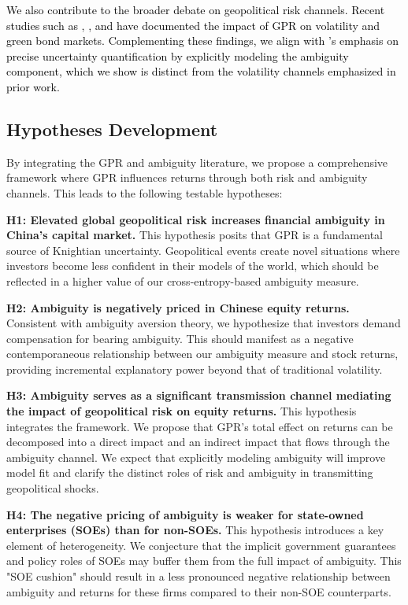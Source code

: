 \documentclass[preprint,12pt,authoryear]{elsarticle}
\begin{document}
\textcolor{black}{We also contribute to the broader debate on geopolitical risk channels. Recent studies such as \citet{Bouri2024}, \citet{Liu2024}, and \citet{Zhang2023} have documented the impact of GPR on volatility and green bond markets. Complementing these findings, we align with \citet{Nemani2023}’s emphasis on precise uncertainty quantification by explicitly modeling the ambiguity component, which we show is distinct from the volatility channels emphasized in prior work.}

\subsection{Hypotheses Development}

By integrating the GPR and ambiguity literature, we propose a comprehensive framework where GPR influences returns through both risk and ambiguity channels. This leads to the following testable hypotheses:

\textbf{H1: Elevated global geopolitical risk increases financial ambiguity in China's capital market.}
This hypothesis posits that GPR is a fundamental source of Knightian uncertainty. Geopolitical events create novel situations where investors become less confident in their models of the world, which should be reflected in a higher value of our cross-entropy-based ambiguity measure.

\textbf{H2: Ambiguity is negatively priced in Chinese equity returns.}
Consistent with ambiguity aversion theory, we hypothesize that investors demand compensation for bearing ambiguity. This should manifest as a negative contemporaneous relationship between our ambiguity measure and stock returns, providing incremental explanatory power beyond that of traditional volatility.

\textbf{H3: Ambiguity serves as a significant transmission channel mediating the impact of geopolitical risk on equity returns.}
This hypothesis integrates the framework. We propose that GPR's total effect on returns can be decomposed into a direct impact and an indirect impact that flows through the ambiguity channel. We expect that explicitly modeling ambiguity will improve model fit and clarify the distinct roles of risk and ambiguity in transmitting geopolitical shocks.

\textbf{H4: The negative pricing of ambiguity is weaker for state-owned enterprises (SOEs) than for non-SOEs.}
This hypothesis introduces a key element of heterogeneity. We conjecture that the implicit government guarantees and policy roles of SOEs may buffer them from the full impact of ambiguity. This "SOE cushion" should result in a less pronounced negative relationship between ambiguity and returns for these firms compared to their non-SOE counterparts.
\end{document}
